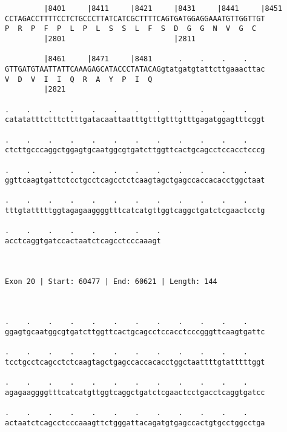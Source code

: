 \documentclass{article}
\begin{document}
\begin{Verbatim}
         |8401     |8411     |8421     |8431     |8441     |8451
CCTAGACCTTTTCCTCTGCCCTTATCATCGCTTTTCAGTGATGGAGGAAATGTTGGTTGT
P  R  P  F  P  L  P  L  S  S  L  F  S  D  G  G  N  V  G  C  
         |2801                         |2811                
  
         |8461     |8471     |8481      .    .    .    .    
GTTGATGTAATTATTCAAAGAGCATACCCTATACAGgtatgatgtattcttgaaacttac
V  D  V  I  I  Q  R  A  Y  P  I  Q                          
         |2821                                              
  
.    .    .    .    .    .    .    .    .    .    .    .    
catatatttctttcttttgatacaattaatttgtttgtttgtttgagatggagtttcggt
                                                            
.    .    .    .    .    .    .    .    .    .    .    .    
ctcttgcccaggctggagtgcaatggcgtgatcttggttcactgcagcctccacctcccg
                                                            
.    .    .    .    .    .    .    .    .    .    .    .    
ggttcaagtgattctcctgcctcagcctctcaagtagctgagccaccacacctggctaat
                                                            
.    .    .    .    .    .    .    .    .    .    .    .    
tttgtatttttggtagagaaggggtttcatcatgttggtcaggctgatctcgaactcctg
                                                            
.    .    .    .    .    .    .    .
acctcaggtgatccactaatctcagcctcccaaagt
                                    
                                    
 
Exon 20 | Start: 60477 | End: 60621 | Length: 144



.    .    .    .    .    .    .    .    .    .    .    .    
ggagtgcaatggcgtgatcttggttcactgcagcctccacctcccgggttcaagtgattc
                                                            
.    .    .    .    .    .    .    .    .    .    .    .    
tcctgcctcagcctctcaagtagctgagccaccacacctggctaattttgtatttttggt
                                                            
.    .    .    .    .    .    .    .    .    .    .    .    
agagaaggggtttcatcatgttggtcaggctgatctcgaactcctgacctcaggtgatcc
                                                            
.    .    .    .    .    .    .    .    .    .    .    .    
actaatctcagcctcccaaagttctgggattacagatgtgagccactgtgcctggcctga
                                                            

\end{Verbatim}
\end{document}
